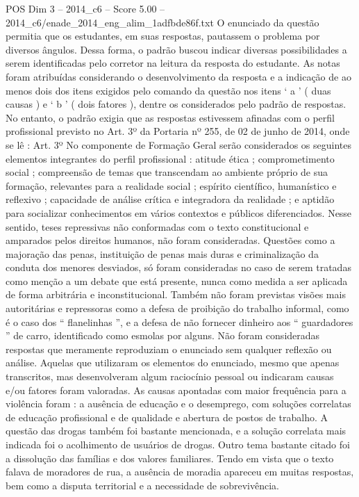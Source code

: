 \begin{textsample}{POS Dim 3 – 2014\_c6 – Score 5.00 – 2014\_c6/enade\_2014\_eng\_alim\_1adfbde86f.txt}
O enunciado da questão permitia que os estudantes, em suas respostas, pautassem o problema por diversos ângulos.
Dessa forma, o padrão buscou indicar diversas possibilidades a serem identificadas pelo corretor na leitura da resposta do estudante.
As notas foram atribuídas considerando o desenvolvimento da resposta e a indicação de ao menos dois dos itens exigidos pelo comando da questão nos itens ‘ a ’ ( duas causas ) e ‘ b ’ ( dois fatores ), dentre os considerados pelo padrão de respostas.
No entanto, o padrão exigia que as respostas estivessem afinadas com o perfil profissional previsto no Art. 3º da Portaria nº 255, de 02 de junho de 2014, onde se lê : Art. 3º No componente de Formação Geral serão considerados os seguintes elementos integrantes do perfil profissional : atitude ética ; comprometimento social ; compreensão de temas que transcendam ao ambiente próprio de sua formação, relevantes para a realidade social ; espírito científico, humanístico e reflexivo ; capacidade de análise crítica e integradora da realidade ; e aptidão para socializar conhecimentos em vários contextos e públicos diferenciados.
Nesse sentido, teses repressivas não conformadas com o texto constitucional e amparados pelos direitos humanos, não foram consideradas.
Questões como a majoração das penas, instituição de penas mais duras e criminalização da conduta dos menores desviados, só foram consideradas no caso de serem tratadas como menção a um debate que está presente, nunca como medida a ser aplicada de forma arbitrária e inconstitucional.
Também não foram previstas visões mais autoritárias e repressoras como a defesa de proibição do trabalho informal, como é o caso dos “ flanelinhas ”, e a defesa de não fornecer dinheiro aos “ guardadores ” de carro, identificado como esmolas por alguns.
Não foram consideradas respostas que meramente reproduziam o enunciado sem qualquer reflexão ou análise.
Aquelas que utilizaram os elementos do enunciado, mesmo que apenas transcritos, mas desenvolveram algum raciocínio pessoal ou indicaram causas e/ou fatores foram valoradas.
As causas apontadas com maior frequência para a violência foram : a ausência de educação e o desemprego, com soluções correlatas de educação profissional e de qualidade e abertura de postos de trabalho.
A questão das drogas também foi bastante mencionada, e a solução correlata mais indicada foi o acolhimento de usuários de drogas.
Outro tema bastante citado foi a dissolução das famílias e dos valores familiares.
Tendo em vista que o texto falava de moradores de rua, a ausência de moradia apareceu em muitas respostas, bem como a disputa territorial e a necessidade de sobrevivência.

\end{textsample}
